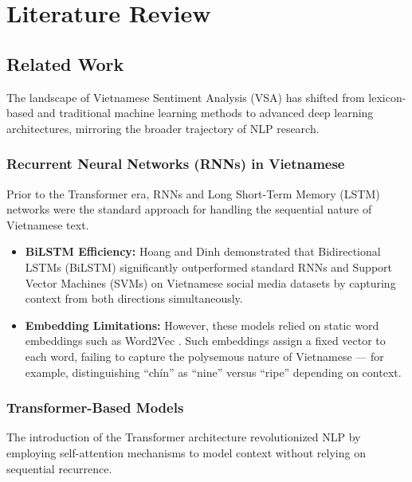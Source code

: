\documentclass[12pt]{report} %
\begin{document}
\chapter{Literature Review}

\section{Related Work}

The landscape of Vietnamese Sentiment Analysis (VSA) has shifted from lexicon-based and traditional machine learning methods to advanced deep learning architectures, mirroring the broader trajectory of NLP research.

\subsection{Recurrent Neural Networks (RNNs) in Vietnamese}

Prior to the Transformer era, RNNs and Long Short-Term Memory (LSTM) networks \cite{hochreiter1997lstm} were the standard approach for handling the sequential nature of Vietnamese text.

\begin{itemize}
    \item \textbf{BiLSTM Efficiency:} Hoang and Dinh \cite{hoang2018} demonstrated that Bidirectional LSTMs (BiLSTM) significantly outperformed standard RNNs and Support Vector Machines (SVMs) on Vietnamese social media datasets by capturing context from both directions simultaneously.

    \item \textbf{Embedding Limitations:} However, these models relied on static word embeddings such as Word2Vec \cite{mikolov2013word2vec}. Such embeddings assign a fixed vector to each word, failing to capture the polysemous nature of Vietnamese --- for example, distinguishing \foreignlanguage{vietnamese}{``chín''} as ``nine'' versus ``ripe'' depending on context.
\end{itemize}

\subsection{Transformer-Based Models}

The introduction of the Transformer architecture revolutionized NLP by employing self-attention mechanisms to model context without relying on sequential recurrence.
\end{document}
